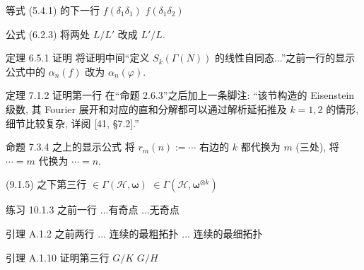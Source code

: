 \documentclass{AJerrata}
\newcommand{\bomega}{\symbf{\omega}}	%
\begin{document}
\begin{Errata}
		\item[等式 (5.4.1) 的下一行]
		\Orig $f(\delta_1 \delta_1)$
		\Corr $f(\delta_1 \delta_2)$
		
		\item[公式 (6.2.3)]
		将两处 $L/L'$ 改成 $L'/L$.
		
		
		\item[定理 6.5.1 证明]
		将证明中间``定义 $S_k(\Gamma(N))$ 的线性自同态...''之前一行的显示公式中的 $\alpha_n(f)$ 改为 $\alpha_n(\varphi)$.
		
		
		\item[定理 7.1.2 证明第一行]
		在``命题 2.6.3''之后加上一条脚注: ``该节构造的 Eisenstein 级数, 其 Fourier 展开和对应的直和分解都可以通过解析延拓推及 $k = 1, 2$ 的情形, 细节比较复杂, 详阅 [41, \S 7.2].''
		
		
		\item[命题 7.3.4 之上的显示公式]
		将 $r_m(n) := \cdots$ 右边的 $k$ 都代换为 $m$ (三处), 将 $\cdots = m$ 代换为 $\cdots = n$.
		
		
		\item[(9.1.5) 之下第三行]
		\Orig $\in \Gamma(\mathcal{H}, \bomega)$
		\Corr $\in \Gamma(\mathcal{H}, \bomega^{\otimes k})$
		
		\item[练习 10.1.3 之前一行]
		\Orig ...有奇点
		\Corr ...无奇点
		
		\item[引理 A.1.2 之前两行]
		\Orig ... 连续的最粗拓扑
		\Corr ... 连续的最细拓扑
		
		\item[引理 A.1.10 证明第三行]
		\Orig $G/K$
		\Corr $G/H$
	\end{Errata}
\end{document}
